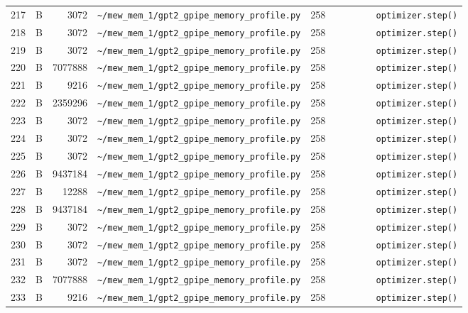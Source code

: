 \documentclass{article}
\begin{document}
\begin{longtable}{r l r p{6.5cm} r p{7.0cm}}
217 & B & 3072 & \lstinline|~/mew_mem_1/gpt2_gpipe_memory_profile.py| & 258 & \lstinline|        optimizer.step()| \\
218 & B & 3072 & \lstinline|~/mew_mem_1/gpt2_gpipe_memory_profile.py| & 258 & \lstinline|        optimizer.step()| \\
219 & B & 3072 & \lstinline|~/mew_mem_1/gpt2_gpipe_memory_profile.py| & 258 & \lstinline|        optimizer.step()| \\
220 & B & 7077888 & \lstinline|~/mew_mem_1/gpt2_gpipe_memory_profile.py| & 258 & \lstinline|        optimizer.step()| \\
221 & B & 9216 & \lstinline|~/mew_mem_1/gpt2_gpipe_memory_profile.py| & 258 & \lstinline|        optimizer.step()| \\
222 & B & 2359296 & \lstinline|~/mew_mem_1/gpt2_gpipe_memory_profile.py| & 258 & \lstinline|        optimizer.step()| \\
223 & B & 3072 & \lstinline|~/mew_mem_1/gpt2_gpipe_memory_profile.py| & 258 & \lstinline|        optimizer.step()| \\
224 & B & 3072 & \lstinline|~/mew_mem_1/gpt2_gpipe_memory_profile.py| & 258 & \lstinline|        optimizer.step()| \\
225 & B & 3072 & \lstinline|~/mew_mem_1/gpt2_gpipe_memory_profile.py| & 258 & \lstinline|        optimizer.step()| \\
226 & B & 9437184 & \lstinline|~/mew_mem_1/gpt2_gpipe_memory_profile.py| & 258 & \lstinline|        optimizer.step()| \\
227 & B & 12288 & \lstinline|~/mew_mem_1/gpt2_gpipe_memory_profile.py| & 258 & \lstinline|        optimizer.step()| \\
228 & B & 9437184 & \lstinline|~/mew_mem_1/gpt2_gpipe_memory_profile.py| & 258 & \lstinline|        optimizer.step()| \\
229 & B & 3072 & \lstinline|~/mew_mem_1/gpt2_gpipe_memory_profile.py| & 258 & \lstinline|        optimizer.step()| \\
230 & B & 3072 & \lstinline|~/mew_mem_1/gpt2_gpipe_memory_profile.py| & 258 & \lstinline|        optimizer.step()| \\
231 & B & 3072 & \lstinline|~/mew_mem_1/gpt2_gpipe_memory_profile.py| & 258 & \lstinline|        optimizer.step()| \\
232 & B & 7077888 & \lstinline|~/mew_mem_1/gpt2_gpipe_memory_profile.py| & 258 & \lstinline|        optimizer.step()| \\
233 & B & 9216 & \lstinline|~/mew_mem_1/gpt2_gpipe_memory_profile.py| & 258 & \lstinline|        optimizer.step()| \\

\end{longtable}
\end{document}
